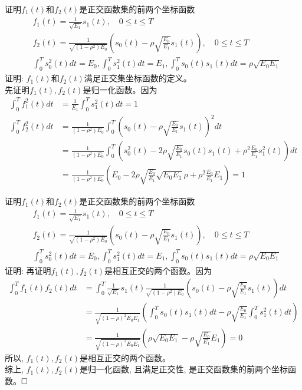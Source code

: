 \begin{frame}[shrink]{证明$f_1(t)$和$f_2(t)$是正交函数集的前两个坐标函数}
\begin{align*}
&f_1(t)=\frac{1}{\sqrt{E_1}}s_1(t),\quad 0\le t\le T\\
&f_2(t)=\frac{1}{\sqrt{(1-\rho^2)E_0}}\left(s_0(t)-\rho\sqrt{\frac{E_0}{E_1}}s_1(t)\right),\quad 0\le t\le T\\
&\int_{0}^{T}s_0^2(t)dt=E_0, \int_{0}^{T}s_1^2(t)dt=E_1, \int_{0}^{T}s_0(t)s_1(t)dt=\rho\sqrt{E_0E_1}
\end{align*}
证明: $f_1(t)$和$f_2(t)$满足正交集坐标函数的定义。\\
先证明$f_1(t), f_2(t)$是归一化函数。因为
\begin{align*}
\int_{0}^{T}f_1^2(t)dt&=\frac{1}{E_1}\int_{0}^{T}s_1^2(t)dt=1\\
\int_{0}^{T}f_2^2(t)dt&=\frac{1}{(1-\rho^2)E_0}\int_{0}^{T}\left(s_0(t)-\rho\sqrt{\frac{E_0}{E_1}}s_1(t)\right)^2dt\\
&=\frac{1}{(1-\rho^2)E_0}\int_{0}^{T}\left(s_0^2(t)-2\rho\sqrt{\frac{E_0}{E_1}}s_0(t)s_1(t)+\rho^2\frac{E_0}{E_1}s_1^2(t)\right)dt\\
&=\frac{1}{(1-\rho^2)E_0}\left(E_0-2\rho\sqrt{\frac{E_0}{E_1}}\sqrt{E_0E_1}\rho+\rho^2\frac{E_0}{E_1}E_1\right)=1
\end{align*}
\end{frame}

\begin{frame}[shrink]{证明$f_1(t)$和$f_2(t)$是正交函数集的前两个坐标函数}
\begin{align*}
&f_1(t)=\frac{1}{\sqrt{E_1}}s_1(t),\quad 0\le t\le T\\
&f_2(t)=\frac{1}{\sqrt{(1-\rho^2)E_0}}\left(s_0(t)-\rho\sqrt{\frac{E_0}{E_1}}s_1(t)\right),\quad 0\le t\le T\\
&\int_{0}^{T}s_0^2(t)dt=E_0, \int_{0}^{T}s_1^2(t)dt=E_1, \int_{0}^{T}s_0(t)s_1(t)dt=\rho\sqrt{E_0E_1}
\end{align*}
证明: 
再证明$f_1(t), f_2(t)$是相互正交的两个函数。因为
\begin{align*}
\int_{0}^{T}f_1(t)f_2(t)dt&=\int_{0}^{T}\frac{1}{\sqrt{E_1}}s_1(t)
\frac{1}{\sqrt{(1-\rho^2)E_0}}\left(s_0(t)-\rho\sqrt{\frac{E_0}{E_1}}s_1(t)\right)dt\\
&=\frac{1}{\sqrt{(1-\rho)^2E_0E_1}}\left(\int_{0}^{T}s_0(t)s_1(t)dt-\rho\sqrt{\frac{E_0}{E_1}}\int_{0}^{T}s_1^2(t)dt\right)\\
&=\frac{1}{\sqrt{(1-\rho)^2E_0E_1}}\left(\rho\sqrt{E_0E_1}-\rho\sqrt{\frac{E_0}{E_1}}E_1\right)=0
\end{align*}
所以, $f_1(t), f_2(t)$是相互正交的两个函数。\\
综上, $f_1(t), f_2(t)$是归一化函数, 且满足正交性, 是正交函数集的前两个坐标函数。$\hfill\square$
\end{frame}


